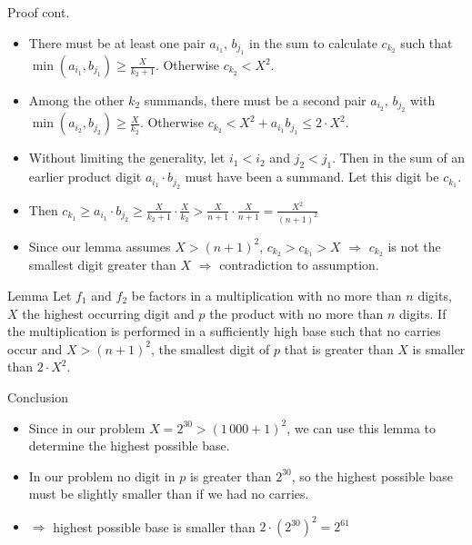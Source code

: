 \begin{slide}
  \begin{block}{Proof cont.}
    \begin{itemize}
      \item There must be at least one pair $a_{i_1}$, $b_{j_1}$ in the sum to calculate $c_{k_2}$ such that
        $\min(a_{i_1}, b_{j_1}) \ge \frac{X}{k_2 + 1}$. Otherwise $c_{k_2} < X^2$.
      \item Among the other $k_2$ summands, there must be a second pair $a_{i_2}$, $b_{j_2}$ with
        $\min(a_{i_2}, b_{j_2}) \ge \frac{X}{k_2}$. Otherwise $c_{k_2} < X^2 + a_{i_1} b_{j_1} \le 2 \cdot X^2$.
      \item Without limiting the generality, let $i_1 < i_2$ and $j_2 < j_1$. Then in the sum of an earlier product digit
        $a_{i_1} \cdot b_{j_2}$ must have been a summand. Let this digit be $c_{k_1}$.
      \item Then $c_{k_1} \ge a_{i_1} \cdot b_{j_2} \ge \frac{X}{k_2 + 1} \cdot \frac{X}{k_2} >
        \frac{X}{n + 1} \cdot \frac{X}{n + 1} = \frac{X^2}{(n + 1)^2}$
      \item Since our lemma assumes $X > (n + 1)^2$, $c_{k_2} > c_{k_1} > X$ $\Rightarrow$ $c_{k_2}$ is not the smallest
        digit greater than $X$ $\Rightarrow$ contradiction to assumption.
    \end{itemize}
  \end{block}
\end{slide}
\begin{slide}
  \begin{block}{Lemma}
    Let $f_1$ and $f_2$ be factors in a multiplication with no more than $n$ digits, $X$ the
    highest occurring digit and $p$ the product with no more than $n$ digits. If the
    multiplication is performed in a sufficiently high base such that no carries occur and
    $X > (n + 1)^{2}$, the smallest digit of $p$ that is greater than $X$ is smaller
    than $2 \cdot X^{2}$.
  \end{block}
  \begin{block}{Conclusion}
    \begin{itemize}
      \item Since in our problem $X = 2^{30} > (1\,000 + 1)^2$, we can use this lemma to determine
        the highest possible base.
      \item In our problem no digit in $p$ is greater than $2^{30}$, so the highest possible base must
        be slightly smaller than if we had no carries.
      \item $\Rightarrow$ highest possible base is smaller than $2 \cdot (2^{30})^2 = 2^{61}$
    \end{itemize}
  \end{block}
\end{slide}
